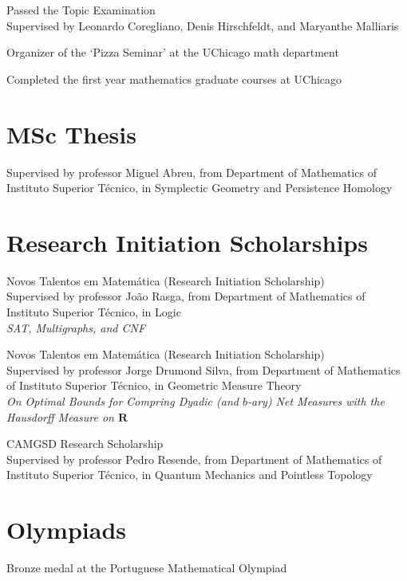 \documentclass[11pt]{article} %
\begin{document}
 \entry Passed the Topic Examination\\
Supervised by Leonardo Coregliano, Denis Hirschfeldt, and Maryanthe Malliaris

 \entry Organizer of the `Pizza Seminar' at the UChicago math department

 \entry Completed the first year mathematics graduate courses at UChicago

\section*{MSc Thesis}

Supervised by professor Miguel Abreu, from Department of Mathematics of Instituto Superior Técnico, in Symplectic Geometry and Persistence Homology

\section*{Research Initiation Scholarships}

 Novos Talentos em Matemática (Research Initiation Scholarship)\\
Supervised by professor João Rasga, from Department of Mathematics of Instituto Superior Técnico, in Logic\\
\textit{SAT, Multigraphs, and CNF}

\medskip

 Novos Talentos em Matemática (Research Initiation Scholarship)\\
Supervised by professor Jorge Drumond Silva, from Department of Mathematics of Instituto Superior Técnico, in Geometric Measure Theory\\
\textit{On Optimal Bounds for Compring Dyadic (and $b$-ary) Net Measures with the Hausdorff Measure on $\mathbf{R}$}
\medskip

 CAMGSD Research Scholarship\\
Supervised by professor Pedro Resende, from Department of Mathematics of Instituto Superior Técnico, in Quantum Mechanics and Pointless Topology

\section*{Olympiads}

 \entry Bronze medal at the Portuguese Mathematical Olympiad
\smallskip
\end{document}
